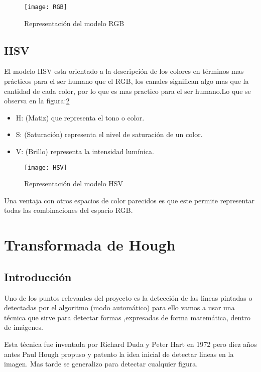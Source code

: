 \begin{figure}[h]
\centering
\texttt{[image: RGB]}
\caption{Representación del modelo RGB\cite{Manual:HAE}}
\label{fig:3.3}
\end{figure}

\subsection{HSV}
El modelo HSV \cite{modelo:hsv} esta orientado a la descripción de los colores en términos mas prácticos para el ser humano que el RGB, los canales significan algo mas que la cantidad de cada color, por lo que es mas practico para el ser humano.Lo que se observa en la figura:\ref{fig:3.4}
 
\begin{itemize}
	\item H: (Matiz) que representa el tono o color.\\
	\item S: (Saturación) representa el nivel de saturación de un color.\\
	\item V: (Brillo) representa la intensidad lumínica.\\
\end{itemize}

\begin{figure}[h]
\centering
\texttt{[image: HSV]}
\caption{Representación del modelo HSV\cite{Manual:HAE}}
\label{fig:3.4}
\end{figure}

Una ventaja con otros espacios de color parecidos es que este permite representar todas las combinaciones del espacio RGB.

\section{Transformada de Hough }

\subsection{Introducción}

Uno de los puntos relevantes del proyecto es la detección de las lineas pintadas o detectadas por el algoritmo (modo automático) para ello vamos a usar una técnica que sirve para detectar formas ,expresadas de forma matemática, dentro de imágenes.

Esta técnica fue inventada por Richard Duda y Peter Hart en 1972 pero diez años antes Paul Hough propuso y patento \cite{pat:patHough} la idea inicial de detectar lineas en la imagen. Mas tarde se generalizo para detectar cualquier figura.

